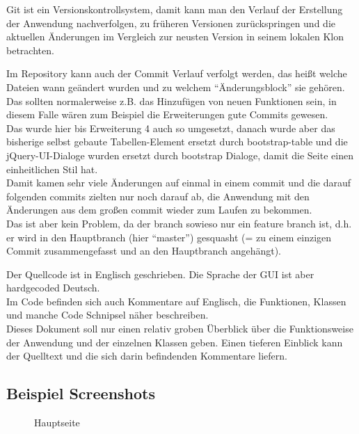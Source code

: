 \documentclass[12pt,pdftex,parskip=half]{scrartcl}
\begin{document}
    Git ist ein Versionskontrollsystem, damit kann man den Verlauf der Erstellung der Anwendung nachverfolgen, zu früheren Versionen zurückspringen und die aktuellen Änderungen im Vergleich zur neusten Version in seinem lokalen Klon betrachten.

    Im Repository kann auch der Commit Verlauf verfolgt werden, das heißt welche Dateien wann geändert wurden und zu welchem "`Änderungsblock"' sie gehören.\\
    Das sollten normalerweise z.B. das Hinzufügen von neuen Funktionen sein, in diesem Falle wären zum Beispiel die Erweiterungen gute Commits gewesen.\\
    Das wurde hier bis Erweiterung 4 auch so umgesetzt, danach wurde aber das bisherige selbst gebaute Tabellen-Element ersetzt durch bootstrap-table und die jQuery-UI-Dialoge wurden ersetzt durch bootstrap Dialoge, damit die Seite einen einheitlichen Stil hat.\\
    Damit kamen sehr viele Änderungen auf einmal in einem commit und die darauf folgenden commits zielten nur noch darauf ab, die Anwendung mit den Änderungen aus dem großen commit wieder zum Laufen zu bekommen.\\
    Das ist aber kein Problem, da der branch sowieso nur ein feature branch ist, d.h. er wird in den Hauptbranch (hier "`master"') gesquasht (= zu einem einzigen Commit zusammengefasst und an den Hauptbranch angehängt).


    Der Quellcode ist in Englisch geschrieben.
    Die Sprache der GUI ist aber hardgecoded Deutsch.\\
    Im Code befinden sich auch Kommentare auf Englisch, die Funktionen, Klassen und manche Code Schnipsel näher beschreiben.\\
    Dieses Dokument soll nur einen relativ groben Überblick über die Funktionsweise der Anwendung und der einzelnen Klassen geben.
    Einen tieferen Einblick kann der Quelltext und die sich darin befindenden Kommentare liefern.



    \newpage


    \subsection{Beispiel Screenshots}

        \begin{figure}[!htb]
            \centering
            \caption{Hauptseite}
        \end{figure}
\end{document}
